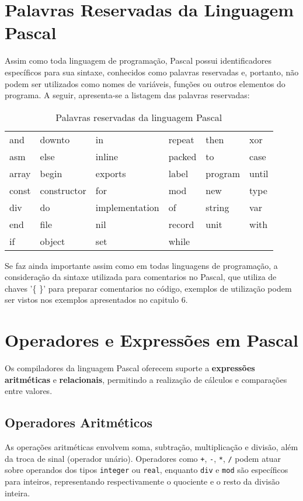 \documentclass[12pt,a4paper,oneside]{abntex2}
\begin{document}
\section{Palavras Reservadas da Linguagem Pascal}
Assim como toda linguagem de programação, Pascal possui identificadores específicos para sua sintaxe, conhecidos como palavras reservadas e, portanto, não podem ser utilizados como nomes de variáveis, funções ou outros elementos do programa. A seguir, apresenta-se a listagem das palavras reservadas:

\begin{table}[H]
    \centering
    \caption{Palavras reservadas da linguagem Pascal}
    \label{tab:palavras-reservadas}
    \begin{tabular}{|l|l|l|l|l|l|}
        \hline
        and & downto & in & repeat & then & xor \\
        asm & else & inline & packed & to & case \\
        array & begin & exports & label & program & until \\
        const & constructor & for & mod & new & type \\
        div & do & implementation & of & string & var \\
        end & file & nil & record & unit & with \\
        if & object & set & while & & \\
        \hline
    \end{tabular}
\end{table}

Se faz ainda importante assim como em todas linguagens de programação, a consideração da sintaxe utilizada para comentarios no Pascal, que utiliza de chaves '\{ \}' para preparar comentarios no código, exemplos de utilização podem ser vistos nos exemplos apresentados no capitulo 6.

\section{Operadores e Expressões em Pascal}
Os compiladores da linguagem Pascal oferecem suporte a \textbf{expressões aritméticas} e \textbf{relacionais}, permitindo a realização de cálculos e comparações entre valores.

\subsection{Operadores Aritméticos}
As operações aritméticas envolvem soma, subtração, multiplicação e divisão, além da troca de sinal (operador unário). Operadores como \texttt{+}, \texttt{-}, \texttt{*}, \texttt{/} podem atuar sobre operandos dos tipos \texttt{integer} ou \texttt{real}, enquanto \texttt{div} e \texttt{mod} são específicos para inteiros, representando respectivamente o quociente e o resto da divisão inteira.
\end{document}
